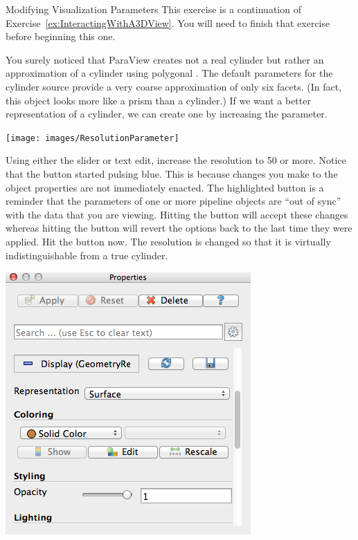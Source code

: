 \begin{exercise}{Modifying Visualization Parameters}
  \label{ex:ModifyingVisualizationParameters}%
  This exercise is a continuation of
  Exercise~\ref{ex:InteractingWithA3DView}. You will need to finish that
  exercise before beginning this one.

  You surely noticed that ParaView creates not a real cylinder but
  rather an approximation of a cylinder using polygonal .
  The default parameters for the cylinder source provide a very coarse
  approximation of only six facets. (In fact, this object looks more like a
  prism than a cylinder.) If we want a better representation of a cylinder,
  we can create one by increasing the  parameter.

  \begin{inlinefig}
    \texttt{[image: images/ResolutionParameter]}
  \end{inlinefig}

  Using either the slider or text edit, increase the resolution to 50 or
  more.  Notice that the  button \apply started pulsing blue.
  This is because changes you make to the object properties are not
  immediately enacted.  The highlighted button is a reminder that the
  parameters of one or more pipeline objects are ``out of sync'' with the
  data that you are viewing.  Hitting the  button will accept
  these changes whereas hitting the   button
  \reset will revert the options back to the last time they were applied.
  Hit the  button now.  The resolution is changed so that it is
  virtually indistinguishable from a true cylinder.

  \begin{inlinefig}
    \includegraphics[width=0.53\scw]{images/DisplayProperties}
  \end{inlinefig}


\end{exercise}
